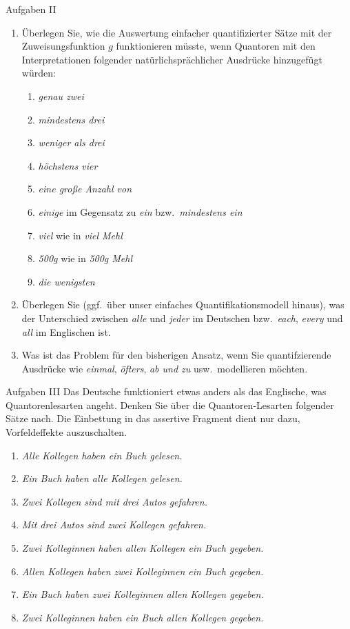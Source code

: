 \begin{frame}
  {Aufgaben II}
  \begin{enumerate}
    \item Überlegen Sie, wie die Auswertung einfacher quantifizierter Sätze mit der Zuweisungsfunktion $g$ funktionieren müsste, wenn Quantoren mit den Interpretationen folgender natürlichsprächlicher Ausdrücke hinzugefügt würden:
      \begin{enumerate}
        \item \textit{genau zwei}
        \item \textit{mindestens drei}
        \item \textit{weniger als drei}
        \item \textit{höchstens vier}
        \item \textit{eine große Anzahl von}
        \item \textit{einige} im Gegensatz zu \textit{ein} bzw.\ \textit{mindestens ein}
        \item \textit{viel} wie in \textit{viel Mehl}
        \item \textit{500g} wie in \textit{500g Mehl}
        \item \textit{die wenigsten}
      \end{enumerate}
      \Halbzeile
    \item Überlegen Sie (ggf.\ über unser einfaches Quantifikationsmodell hinaus), was der Unterschied zwischen \textit{alle} und \textit{jeder} im Deutschen bzw.\ \textit{each}, \textit{every} und \textit{all} im Englischen ist.
      \Halbzeile
    \item Was ist das Problem für den bisherigen Ansatz, wenn Sie quantifzierende Ausdrücke wie \textit{einmal}, \textit{öfters}, \textit{ab und zu} usw.\ modellieren möchten.
  \end{enumerate}
\end{frame}

\begin{frame}
  {Aufgaben III}
  Das Deutsche funktioniert etwas anders als das Englische, was Quantorenlesarten angeht. Denken Sie über die Quantoren-Lesarten folgender Sätze nach. Die Einbettung in das assertive Fragment dient nur dazu, Vorfeldeffekte auszuschalten.
  \Halbzeile
  \begin{enumerate}[<+->]
    \item \textit{Alle Kollegen haben ein Buch gelesen.}
    \item \textit{Ein Buch haben alle Kollegen gelesen.}
    \item \textit{Zwei Kollegen sind mit drei Autos gefahren.}
    \item \textit{Mit drei Autos sind zwei Kollegen gefahren.}
    \item \textit{Zwei Kolleginnen haben allen Kollegen ein Buch gegeben.}
    \item \textit{Allen Kollegen haben zwei Kolleginnen ein Buch gegeben.}
    \item \textit{Ein Buch haben zwei Kolleginnen allen Kollegen gegeben.}
    \item \textit{Zwei Kolleginnen haben ein Buch allen Kollegen gegeben.}
  \end{enumerate}
\end{frame}


